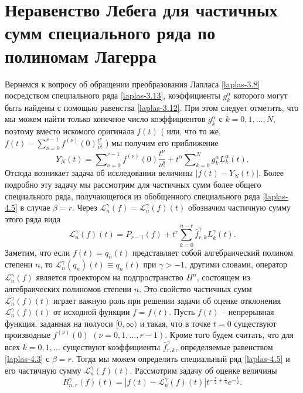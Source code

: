 \section{Неравенство Лебега для частичных сумм специального ряда  по полиномам Лагерра}\label{laplas6}
Вернемся к вопросу об обращении преобразования Лапласа \eqref{laplas-3.8} посредством специального ряда \eqref{laplas-3.13}, коэффициенты $g_k^\alpha$ которого могут быть найдены с помощью равенства  \eqref{laplas-3.12}. При этом следует отметить, что мы можем найти только конечное число  коэффициентов $g_k^\alpha$ с $k=0,1,\ldots, N$, поэтому вместо искомого оригинала $f(t)$ ( или, что то же, $f(t)-\sum\nolimits_{\nu=0}^{r-1}f^{(\nu)}(0)\frac{t^\nu}{\nu!}$ ) мы получим его приближение
\begin{equation*}
Y_N(t)=\sum\nolimits_{\nu=0}^{r-1}f^{(\nu)}(0)\frac{t^\nu}{\nu!}+t^\alpha\sum\nolimits_{k=0}^{N} g_k^\alpha L_k^\alpha(t).
\end{equation*}
 Отсюда возникает задача об исследовании величины $|f(t)-Y_N(t)|$. Более подробно эту задачу мы рассмотрим для частичных сумм более общего специального ряда, получающегося из обобщенного специального ряда \eqref{laplas-4.5}  в случае $\beta=r$. Через $\mathcal{L}_n^\gamma(f)=\mathcal{L}_n^\gamma(f)(t)$ обозначим частичную сумму этого ряда  вида
\begin{equation*}
  \mathcal{L}_n^\gamma(f)(t)=P_{r-1}(f)+t^r\sum\limits_{k=0}^{n-r}\hat{f}_{r,k}^\gamma L_k^\gamma(t).
\end{equation*}
 Заметим, что если $f(t)=q_n(t)$ представляет собой алгебраический полином степени $n$, то
$\mathcal{L}_n^\gamma(q_n)(t)\equiv q_n(t)$ при $\gamma>-1$, другими словами, оператор $\mathcal{L}_n^\gamma(f)$ является проектором на подпространство $H^n$, состоящем из алгебраических полиномов степени $n$.
Это свойство частичных сумм  $\mathcal{L}_n^\gamma(f)(t)$ играет важную роль при решении задачи об оценке отклонения $\mathcal{L}_n^\gamma(f)(t)$ от исходной функции $f=f(t)$. Пусть $f(t)$ -- непрерывная функция, заданная на полуоси $[0,\infty)$ и такая, что в точке $t=0$ существуют производные $f^{(\nu)}(0)$ $(\nu=0,1,\dots,r-1)$. Кроме того будем считать, что для всех $k=0,1,\ldots$ существуют коэффициенты $\hat{f}_{r,k}^\gamma$, определяемые равенством \eqref{laplas-4.3} с $\beta=r$. Тогда мы можем определить специальный ряд \eqref{laplas-4.5} и его частичную сумму $\mathcal{L}_n^\gamma(f)(t)$. Рассмотрим задачу об оценке величины
\begin{equation}\label{laplas-6.1}
  R_{n,r}^\gamma(f)(t)=|f(t)-\mathcal{L}_n^\gamma(f)(t)|t^{-\frac r2+\frac14}e^{-\frac t2}.
\end{equation}
